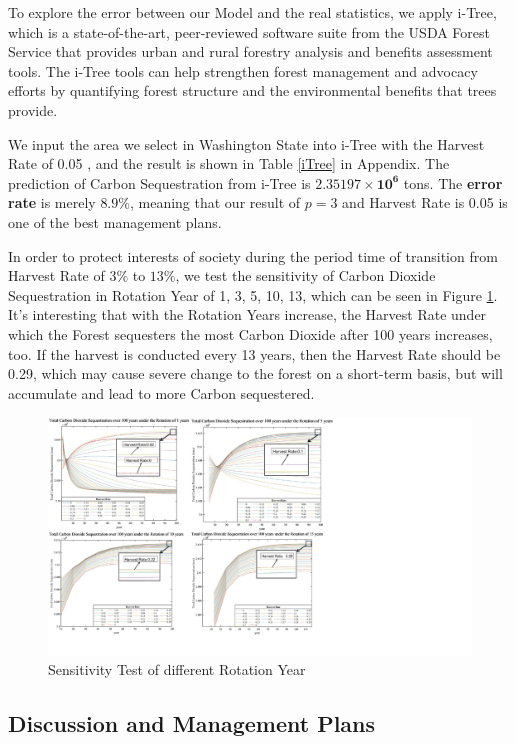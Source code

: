 \documentclass{mcmthesis}
\numberwithin{figure}{section}
\numberwithin{table}{section}
\numberwithin{equation}{section}
\begin{document}
To explore the error between our Model and the real statistics, we apply i-Tree, which
is a state-of-the-art, peer-reviewed software suite from the USDA Forest Service 
that provides urban and rural forestry analysis and benefits assessment tools. 
The i-Tree tools can help strengthen forest management and advocacy efforts by 
quantifying forest structure and the environmental benefits that trees provide.
\par
We input the area we select in Washington State into i-Tree with the Harvest Rate of 0.05
, and the result is shown in Table \ref{iTree} in Appendix. The prediction of Carbon 
Sequestration from i-Tree is $\bm{2.35197\times 10^6}$ tons. The \textbf{error rate} 
is merely $ \bm{8.9\%} $, meaning that our result of $ p = 3 $ and Harvest Rate
is 0.05 is one of the best management plans. 
\par
In order to protect interests of society during the period time of transition from 
Harvest Rate of $ 3\% $ to $ 13\% $, we test the sensitivity of Carbon Dioxide Sequestration
in Rotation Year of 1, 3, 5, 10, 13, which can be seen in Figure \ref{RotationYear}.
It's interesting that with the Rotation Years increase, the Harvest Rate under which the Forest
sequesters the most Carbon Dioxide after 100 years increases, too. If the harvest is conducted
every 13 years, then the Harvest Rate should be 0.29, which may cause severe change to the
forest on a short-term basis, but will accumulate and lead to more Carbon sequestered.

\begin{figure}[htbp]
  \centering
  \includegraphics[width = 16cm]{code&pic/轮伐图.pdf}
  \caption{Sensitivity Test of different Rotation Year}\label{RotationYear}
\end{figure}

\subsection{Discussion and Management Plans}
\end{document}
